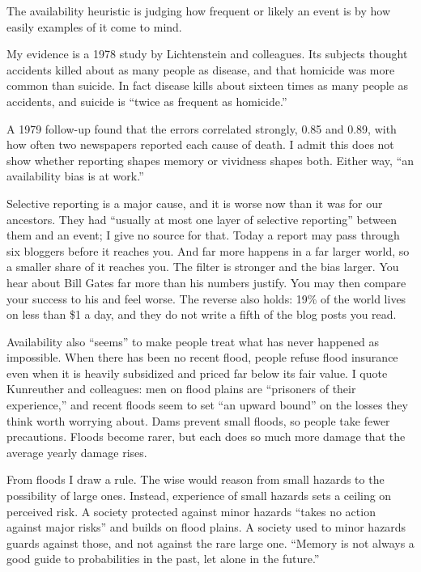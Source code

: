 
The availability heuristic is judging how frequent or likely an event is by how easily examples of it come to mind. 

My evidence is a 1978 study by Lichtenstein and colleagues. Its subjects thought accidents killed about as many people as disease, and that homicide was more common than suicide. In fact disease kills about sixteen times as many people as accidents, and suicide is ``twice as frequent as homicide.''

A 1979 follow-up found that the errors correlated strongly, 0.85 and 0.89, with how often two newspapers reported each cause of death. I admit this does not show whether reporting shapes memory or vividness shapes both. Either way, ``an availability bias is at work.''

Selective reporting is a major cause, and it is worse now than it was for our ancestors. They had ``usually at most one layer of selective reporting'' between them and an event; I give no source for that. Today a report may pass through six bloggers before it reaches you. And far more happens in a far larger world, so a smaller share of it reaches you. The filter is stronger and the bias larger. You hear about Bill Gates far more than his numbers justify. You may then compare your success to his and feel worse. The reverse also holds: 19\% of the world lives on less than \$1 a day, and they do not write a fifth of the blog posts you read. 

Availability also ``seems'' to make people treat what has never happened as impossible. When there has been no recent flood, people refuse flood insurance even when it is heavily subsidized and priced far below its fair value. I quote Kunreuther and colleagues: men on flood plains are ``prisoners of their experience,'' and recent floods seem to set ``an upward bound'' on the losses they think worth worrying about.  Dams prevent small floods, so people take fewer precautions. Floods become rarer, but each does so much more damage that the average yearly damage rises.

From floods I draw a rule. The wise would reason from small hazards to the possibility of large ones. Instead, experience of small hazards sets a ceiling on perceived risk. A society protected against minor hazards ``takes no action against major risks'' and builds on flood plains. A society used to minor hazards guards against those, and not against the rare large one.  ``Memory is not always a good guide to probabilities in the past, let alone in the future.''
